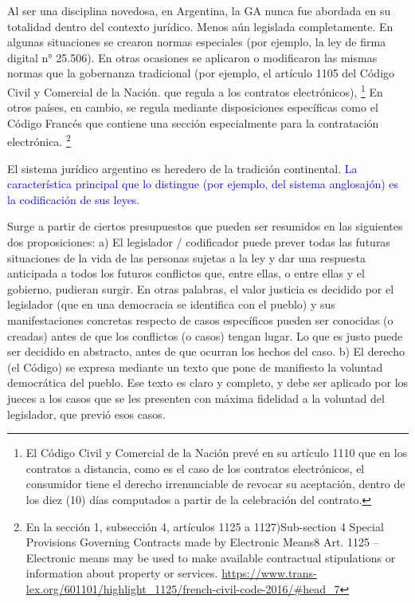 \documentclass[12pt]{report} %
\begin{document}
Al ser una disciplina novedosa, en Argentina, la GA nunca fue abordada en su totalidad dentro del contexto jurídico. Menos aún legislada completamente. En algunas situaciones se crearon normas especiales (por ejemplo, la ley de firma digital n° 25.506). En otras ocasiones se aplicaron o modificaron las mismas normas que la gobernanza tradicional (por ejemplo, el artículo 1105 del Código Civil y Comercial de la Nación. que regula a los contratos electrónicos), \footnote{El Código Civil y Comercial de la Nación prevé en su artículo 1110 que en los contratos a distancia, como es el caso de los contratos electrónicos, el consumidor tiene el derecho irrenunciable de revocar su aceptación, dentro de los diez (10) días computados a partir de la celebración del contrato.} En otros países, en cambio, se regula mediante disposiciones específicas como el Código Francés que contiene una sección especialmente para la contratación electrónica. \footnote{En la sección 1, subsección 4, artículos 1125 a 1127)Sub-section 4 Special Provisions Governing Contracts made by Electronic Means8 Art. 1125 –Electronic means may be used to make available contractual stipulations or information about property or services.  \url{https://www.trans-lex.org/601101/highlight\_1125/french-civil-code-2016/\#head_7}}


El sistema jurídico argentino es heredero de la tradición continental. \textcolor{blue}{La característica principal que lo distingue (por ejemplo, del sistema anglosajón) es la codificación de sus leyes.}


Surge a partir de ciertos presupuestos que pueden ser resumidos en las siguientes dos proposiciones: a) El legislador / codificador puede prever todas las futuras situaciones de la vida de las personas sujetas a la ley y dar una respuesta anticipada a todos los futuros conflictos que, entre ellas, o entre ellas y el gobierno, pudieran surgir. En otras palabras, el valor justicia es decidido por el legislador (que en una democracia se identifica con el pueblo) y sus manifestaciones concretas respecto de casos específicos pueden ser conocidas (o creadas) antes de que los conflictos (o casos) tengan lugar. Lo que es justo puede ser decidido en abstracto, antes de que ocurran los hechos del caso. b) El derecho (el Código) se expresa mediante un texto que pone de manifiesto la voluntad democrática del pueblo. Ese texto es claro y completo, y debe ser aplicado por los jueces a los casos que se les presenten con máxima fidelidad a la voluntad del legislador, que previó esos casos. 
\end{document}
